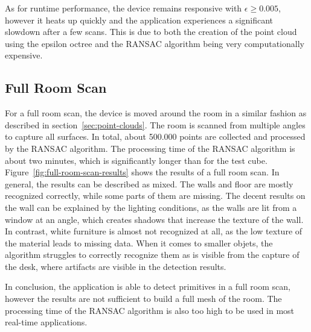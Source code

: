 As for runtime performance, the device remains responsive with $\epsilon\geq0.005$, however it heats
up quickly and the application experiences a significant slowdown after a few scans.
This is due to both the creation of the point cloud using the epsilon octree and the RANSAC algorithm being
very computationally expensive.

\subsection{Full Room Scan}\label{subsec:application-performance-full-room}

For a full room scan, the device is moved around the room in a similar fashion as described in section~\ref{sec:point-clouds}.
The room is scanned from multiple angles to capture all surfaces.
In total, about 500.000 points are collected and processed by the RANSAC algorithm.
The processing time of the RANSAC algorithm is about two minutes, which is significantly longer than for the test cube.
Figure~\ref{fig:full-room-scan-results} shows the results of a full room scan.
In general, the results can be described as mixed.
The walls and floor are mostly recognized correctly, while some parts of them are missing.
The decent results on the wall can be explained by the lighting conditions, as the walls are lit from a window at an angle,
which creates shadows that increase the texture of the wall.
In contrast, white furniture is almost not recognized at all, as the low texture of the material leads
to missing data.
When it comes to smaller objets, the algorithm struggles to correctly recognize them
as is visible from the capture of the desk, where artifacts are visible in the detection results.

In conclusion, the application is able to detect primitives in a full room scan,
however the results are not sufficient to build a full mesh of the room.
The processing time of the RANSAC algorithm is also too high to be used in most real-time applications.

